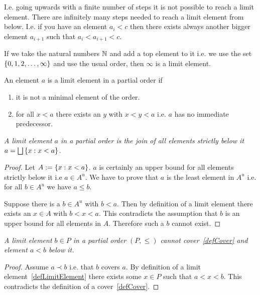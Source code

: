 I.e. going upwards with a finite number of steps it is not possible to reach a
limit element. There are infinitely many steps needed to reach a limit element
from below. I.e. if you have an element $a_i < c$ then there exists always
another bigger element $a_{i+1}$ such that $a_i < a_{i+1} < c$.


If we take the natural numbers $\mathbb N$ and add a top element to it i.e. we use the
set $\left\{0,1,2, \ldots, \infty\right\}$ and use the usual order, then $\infty$ is a
limit element.

\begin{definition}
    \label{defLimitElement}

    An element $a$ is a limit element in a partial order if
    \begin{enumerate}
        \item it is not a minimal element of the order.

        \item for all $x < a$ there exists an $y$ with $x < y < a$
            i.e. $a$ has no immediate predecessor.
    \end{enumerate}

\end{definition}


\begin{theorem}
    \label{thmLimitElementIsJoin}
    \emph{A limit element $a$ in a partial order is the join of all elements
    strictly below it $a = \bigsqcup \left\{x: x < a\right\}$.}

    \begin{proof}
        Let $A := \left\{x: x < a\right\}$.
        $a$ is certainly an upper bound for all elements strictly below it i.e
        $a \in A^u$. We have to prove that $a$ is the least element in $A^u$
        i.e. for all $b \in A^u$ we have  $a \le b$.

        Suppose there is a $b \in A^u$ with $b < a$. Then by definition of a
        limit element there exists an $x \in A$ with $b < x < a$. This
        contradicts the assumption that $b$ is an upper bound for all elements
        in $A$. Therefore such a $b$ cannot exist.
    \end{proof}
\end{theorem}


\begin{theorem}
    \label{thmLimitNoCover}
    \emph{
        A limit element $b \in P$ in a partial order $(P, \le)$ cannot
        cover~\ref{defCover} and element $a < b$ below it.
    }

    \begin{proof}
        Assume $a \prec b$ i.e. that $b$ covers $a$. By definition of a limit
        element~\ref{defLimitElement} there exists some $x \in P$ such that $a <
        x < b$. This contradicts the definition of a cover~\ref{defCover}.
    \end{proof}
\end{theorem}






